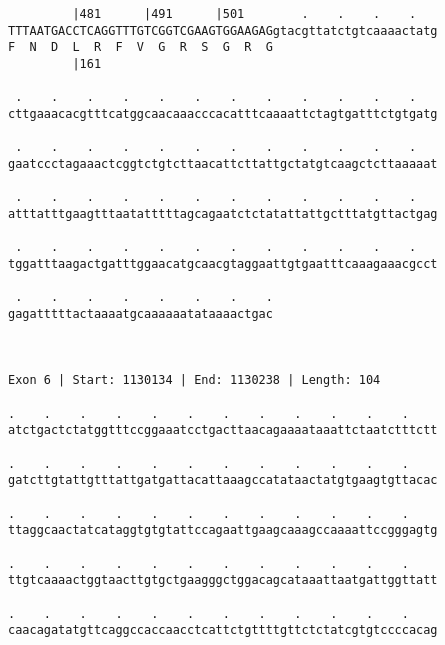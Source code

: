\documentclass{article}
\begin{document}
\begin{Verbatim}
         |481      |491      |501        .    .    .    .   
TTTAATGACCTCAGGTTTGTCGGTCGAAGTGGAAGAGgtacgttatctgtcaaaactatg
F  N  D  L  R  F  V  G  R  S  G  R  G                       
         |161                                               
  
 .    .    .    .    .    .    .    .    .    .    .    .   
cttgaaacacgtttcatggcaacaaacccacatttcaaaattctagtgatttctgtgatg
                                                            
 .    .    .    .    .    .    .    .    .    .    .    .   
gaatccctagaaactcggtctgtcttaacattcttattgctatgtcaagctcttaaaaat
                                                            
 .    .    .    .    .    .    .    .    .    .    .    .   
atttatttgaagtttaatatttttagcagaatctctatattattgctttatgttactgag
                                                            
 .    .    .    .    .    .    .    .    .    .    .    .   
tggatttaagactgatttggaacatgcaacgtaggaattgtgaatttcaaagaaacgcct
                                                            
 .    .    .    .    .    .    .    .
gagatttttactaaaatgcaaaaaatataaaactgac
                                     
                                     
 
Exon 6 | Start: 1130134 | End: 1130238 | Length: 104
 
.    .    .    .    .    .    .    .    .    .    .    .    
atctgactctatggtttccggaaatcctgacttaacagaaaataaattctaatctttctt
                                                            
.    .    .    .    .    .    .    .    .    .    .    .    
gatcttgtattgtttattgatgattacattaaagccatataactatgtgaagtgttacac
                                                            
.    .    .    .    .    .    .    .    .    .    .    .    
ttaggcaactatcataggtgtgtattccagaattgaagcaaagccaaaattccgggagtg
                                                            
.    .    .    .    .    .    .    .    .    .    .    .    
ttgtcaaaactggtaacttgtgctgaagggctggacagcataaattaatgattggttatt
                                                            
.    .    .    .    .    .    .    .    .    .    .    .    
caacagatatgttcaggccaccaacctcattctgttttgttctctatcgtgtccccacag
                                                            

\end{Verbatim}
\end{document}
